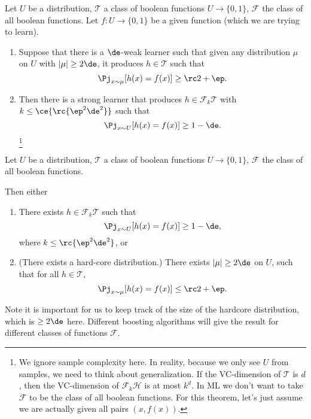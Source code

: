 \begin{thm}\label{thm:boosting}
Let $U$ be a distribution, $\mathcal T$ a class of boolean functions $U\to \{0,1\}$,  $\mathcal F$ the class of all boolean functions. 
Let $f:U\to \{0,1\}$ be a given function (which we are trying to learn).

\begin{enumerate}
\item
Suppose that there is a $\de$-weak learner such that given any distribution $\mu$ on $U$ with $|\mu|\ge 2\de$, it produces $h\in \mathcal T$ such that 
$$
\Pj_{x\sim \mu} [h(x) = f(x)] \ge \rc 2+ \ep.
$$
\item
Then there is a strong learner that produces $h\in \mathcal F_k\mathcal T$ with $k\le\ce{\rc{\ep^2\de^2}}$ such that 
$$
\Pj_{x\sim U} [h(x) = f(x)]\ge 1-\de.
$$
\footnote{
We ignore sample complexity here. In reality, because we only see $U$ from samples, we need to think about generalization. If the VC-dimension of $\mathcal T$ is $d$, then the VC-dimension of $\mathcal F_k\mathcal H$ is at most $k^d$. In ML we don't want to take $\mathcal F$ to be the class of all boolean functions. For this theorem, let's just assume we are actually given all pairs $(x,f(x))$.
}
\end{enumerate}
\end{thm}

\begin{thm}
\label{thm:hardcore}
Let $U$ be a distribution, $\mathcal T$ a class of boolean functions $U\to \{0,1\}$, $\mathcal F$ the class of all boolean functions.

Then either
\begin{enumerate}
\item %
There exists $h\in \mathcal F_k \mathcal T$ such that 
$$
\Pj_{x\sim U} [h(x)=f(x)] \ge 1-\de,
$$
where $k\le\rc{\ep^2\de^2}$,
or
\item (There exists a hard-core distribution.)
There exists $|\mu|\ge 2\de$ on $U$, such that for all $h\in \mathcal T$, 
$$
\Pj_{x\sim \mu}[h(x) = f(x)] \le \rc 2+\ep.
$$
\end{enumerate}
\end{thm}

Note it is important for us to keep track of the size of the hardcore distribution, which is $\ge 2\de$ here.
Different boosting algorithms will give the result for different classes of functions $\mathcal F$.

